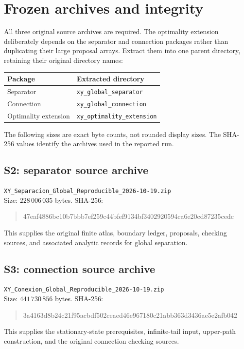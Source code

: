 \documentclass[10pt]{article}
\newcommand{\code}[1]{\nolinkurl{#1}}
\begin{document}
\clearpage
\section{Frozen archives and integrity}

All three original source archives are required. The optimality extension
deliberately depends on the separator and connection packages rather than
duplicating their large proposal arrays. Extract them into one parent
directory, retaining their original directory names:
\begin{center}
\begin{tabular}{@{}ll@{}}
\toprule
Package & Extracted directory\\
\midrule
Separator & \code{xy_global_separator}\\
Connection & \code{xy_global_connection}\\
Optimality extension & \code{xy_optimality_extension}\\
\bottomrule
\end{tabular}
\end{center}

The following sizes are exact byte counts, not rounded display sizes.
The SHA-256 values identify the archives used in the reported run.

\subsection*{S2: separator source archive}
\noindent\code{XY_Separacion_Global_Reproducible_2026-10-19.zip}\\
Size: $228\,006\,035$ bytes. SHA-256:
\begin{quote}\small\ttfamily
47eaf4886bc10b7bbb7ef259c44bfef9134bf3402920594ca6e20cd87235cedc
\end{quote}
This supplies the original finite atlas, boundary ledger, proposals,
checking sources, and associated analytic records for global separation.

\subsection*{S3: connection source archive}
\noindent\code{XY_Conexion_Global_Reproducible_2026-10-19.zip}\\
Size: $441\,730\,856$ bytes. SHA-256:
\begin{quote}\small\ttfamily
3a4163d8b24c21f95acbdf502ceaed46e967180c21abb363d3436ae5e2afb042
\end{quote}
This supplies the stationary-state prerequisites, infinite-tail input,
upper-path construction, and the original connection checking sources.
\end{document}
